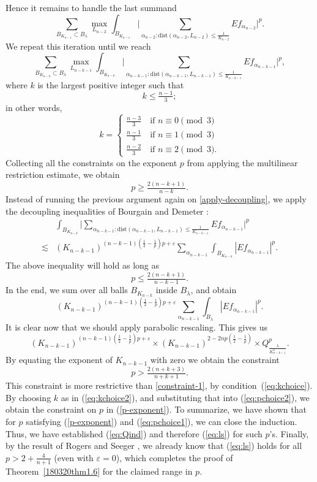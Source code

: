 \documentclass[12pt,leqno]{amsart}
\def\beq{\begin{equation}}
\def\endeq{\end{equation}}
\def\lesim{\lesssim}
\theoremstyle{plain}
\numberwithin{equation}{section}
\begin{document}
Hence it remains to handle the last summand 
\[
\sum_{B_{K_{n-1}}\subset B_{\lambda}}\max_{L_{n-2}} \int_{B_{K_{n-1}}}\Big|\sum_{\alpha_{n-2}: \text{dist}(\alpha_{n-2}, L_{n-2})\le \frac{1}{K_{n-2}}}Ef_{\alpha_{n-2}}\Big|^p.
\]
We repeat this iteration until we reach
\beq\label{apply-decoupling}
\sum_{B_{K_{n-k}}\subset B_{\lambda}}\max_{L_{n-k-1}} \int_{B_{K_{n-k}}}\Big|\sum_{\alpha_{n-k-1}: \text{dist}(\alpha_{n-k-1}, L_{n-k-1})\le \frac{1}{K_{n-k-1}}}Ef_{\alpha_{n-k-1}}\Big|^p,
\endeq
where $k$ is the largest positive integer such that
\beq \label{eq:kchoice}
k \leq \tfrac{n-1}{3};
\endeq
in other words, 
\beq \label{eq:kchoice2}
k = 
\begin{cases}
\frac{n-3}{3} \quad \text{if $n \equiv 0 \pmod 3$} \\
\frac{n-1}{3} \quad \text{if $n \equiv 1 \pmod 3$} \\
\frac{n-2}{3} \quad \text{if $n \equiv 2 \pmod 3$}.
\end{cases}
\endeq
Collecting all the constraints on the exponent $p$ from applying the multilinear restriction estimate, we obtain 
\beq\label{constraint-1}
p\ge \tfrac{2(n-k+1)}{n-k}.
\endeq
Instead of running the previous argument again on \eqref{apply-decoupling}, we apply the decoupling inequalities of Bourgain and Demeter \cite{MR3374964}:
\[
\begin{split}
& \int_{B_{K_{n-k}}}\Big|\sum_{\alpha_{n-k-1}: \text{dist}(\alpha_{n-k-1}, L_{n-k-1})\le \frac{1}{K_{n-k-1}}}Ef_{\alpha_{n-k-1}}\Big|^p\\
\lesim & (K_{n-k-1})^{(n-k-1)(\frac{1}{2}-\frac{1}{p})p + \varepsilon} \sum_{\alpha_{n-k-1}} \int_{B_{K_{n-k}}} |Ef_{\alpha_{n-k-1}}|^p.
\end{split}
\]
The above inequality will hold as long as 
\beq \label{eq:pchoice1}
p \le \tfrac{2(n-k+1)}{n-k-1}.
\endeq 
In the end, we sum over all balls $B_{K_{n-k}}$ inside $B_{\lambda}$, and obtain 
\[ 
(K_{n-k-1})^{(n-k-1)(\frac{1}{2}-\frac{1}{p})p + \varepsilon} \sum_{\alpha_{n-k-1}} \int_{B_{\lambda}} |Ef_{\alpha_{n-k-1}}|^p.
\]
It is clear now that we should apply parabolic rescaling. This gives us
\[
(K_{n-k-1})^{(n-k-1)(\frac{1}{2}-\frac{1}{p})p + \varepsilon} \times (K_{n-k-1})^{2-2np(\frac{1}{2}-\frac{1}{p})} \times Q_{\frac{\lambda}{K_{n-k-1}^2}}^p.
\]
By equating the exponent of $K_{n-k-1}$ with zero we obtain the constraint
\beq \label{eq:pchoice2}
p> \tfrac{2(n+k+3)}{n+k+1}.
\endeq
This constraint is more restrictive than \eqref{constraint-1}, by condition~(\ref{eq:kchoice}). 
By choosing $k$ as in (\ref{eq:kchoice2}), and substituting that into (\ref{eq:pchoice2}), we obtain the constraint on $p$ in (\ref{p-exponent}). To summarize, we have shown that for $p$ satisfying (\ref{p-exponent}) and (\ref{eq:pchoice1}), we can close the induction. Thus, we have established (\ref{eq:Qind}) and therefore (\ref{eq:ls}) for such $p$'s. 
Finally, by the result of Rogers and Seeger \cite{MR2629687}, we already know that (\ref{eq:ls}) holds for all $p>2+\frac{4}{n+1}$ (even with $\varepsilon=0$), which completes the proof of Theorem~\ref{180320thm1.6} for the claimed range in $p$. 
\end{document}
